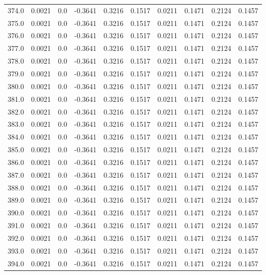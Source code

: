 \begin{longtable}{lrrrrrrrrr}
374.0 & 0.0021 & 0.0 & -0.3641 & 0.3216 & 0.1517 & 0.0211 & 0.1471 & 0.2124 & 0.1457 \\
375.0 & 0.0021 & 0.0 & -0.3641 & 0.3216 & 0.1517 & 0.0211 & 0.1471 & 0.2124 & 0.1457 \\
376.0 & 0.0021 & 0.0 & -0.3641 & 0.3216 & 0.1517 & 0.0211 & 0.1471 & 0.2124 & 0.1457 \\
377.0 & 0.0021 & 0.0 & -0.3641 & 0.3216 & 0.1517 & 0.0211 & 0.1471 & 0.2124 & 0.1457 \\
378.0 & 0.0021 & 0.0 & -0.3641 & 0.3216 & 0.1517 & 0.0211 & 0.1471 & 0.2124 & 0.1457 \\
379.0 & 0.0021 & 0.0 & -0.3641 & 0.3216 & 0.1517 & 0.0211 & 0.1471 & 0.2124 & 0.1457 \\
380.0 & 0.0021 & 0.0 & -0.3641 & 0.3216 & 0.1517 & 0.0211 & 0.1471 & 0.2124 & 0.1457 \\
381.0 & 0.0021 & 0.0 & -0.3641 & 0.3216 & 0.1517 & 0.0211 & 0.1471 & 0.2124 & 0.1457 \\
382.0 & 0.0021 & 0.0 & -0.3641 & 0.3216 & 0.1517 & 0.0211 & 0.1471 & 0.2124 & 0.1457 \\
383.0 & 0.0021 & 0.0 & -0.3641 & 0.3216 & 0.1517 & 0.0211 & 0.1471 & 0.2124 & 0.1457 \\
384.0 & 0.0021 & 0.0 & -0.3641 & 0.3216 & 0.1517 & 0.0211 & 0.1471 & 0.2124 & 0.1457 \\
385.0 & 0.0021 & 0.0 & -0.3641 & 0.3216 & 0.1517 & 0.0211 & 0.1471 & 0.2124 & 0.1457 \\
386.0 & 0.0021 & 0.0 & -0.3641 & 0.3216 & 0.1517 & 0.0211 & 0.1471 & 0.2124 & 0.1457 \\
387.0 & 0.0021 & 0.0 & -0.3641 & 0.3216 & 0.1517 & 0.0211 & 0.1471 & 0.2124 & 0.1457 \\
388.0 & 0.0021 & 0.0 & -0.3641 & 0.3216 & 0.1517 & 0.0211 & 0.1471 & 0.2124 & 0.1457 \\
389.0 & 0.0021 & 0.0 & -0.3641 & 0.3216 & 0.1517 & 0.0211 & 0.1471 & 0.2124 & 0.1457 \\
390.0 & 0.0021 & 0.0 & -0.3641 & 0.3216 & 0.1517 & 0.0211 & 0.1471 & 0.2124 & 0.1457 \\
391.0 & 0.0021 & 0.0 & -0.3641 & 0.3216 & 0.1517 & 0.0211 & 0.1471 & 0.2124 & 0.1457 \\
392.0 & 0.0021 & 0.0 & -0.3641 & 0.3216 & 0.1517 & 0.0211 & 0.1471 & 0.2124 & 0.1457 \\
393.0 & 0.0021 & 0.0 & -0.3641 & 0.3216 & 0.1517 & 0.0211 & 0.1471 & 0.2124 & 0.1457 \\
394.0 & 0.0021 & 0.0 & -0.3641 & 0.3216 & 0.1517 & 0.0211 & 0.1471 & 0.2124 & 0.1457 \\

\end{longtable}
